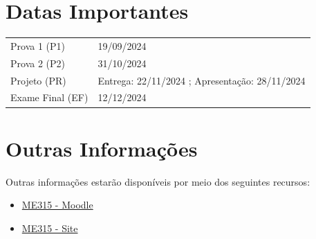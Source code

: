 \documentclass[paper=letter, fontsize=12pt]{scrartcl} %
\begin{document}
\section{Datas Importantes}

\begin{tabular}{ll}
Prova 1 (P1) & 19/09/2024 \\
Prova 2 (P2) & 31/10/2024 \\
Projeto (PR) & Entrega: 22/11/2024 ; Apresentação: 28/11/2024 \\
Exame Final (EF) & 12/12/2024 \\
\end{tabular}

\section{Outras Informações}

Outras informações estarão disponíveis por meio dos seguintes recursos:

\begin{itemize}
\item \href{https://moodle.ggte.unicamp.br/course/view.php?id=19752}{{\color{blue} ME315 - Moodle}}
\item \href{https://me315-unicamp.github.io}{{\color{blue} ME315 - Site}}
\end{itemize}
\end{document}
